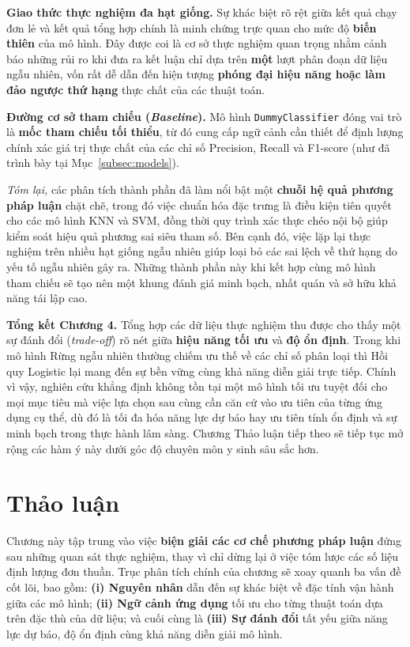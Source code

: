 \documentclass[14pt,a4paper]{extreport}
\begin{document}
\textbf{Giao thức thực nghiệm đa hạt giống.} Sự khác biệt rõ rệt giữa kết quả chạy đơn lẻ và kết quả tổng hợp chính là minh chứng trực quan cho mức độ \textbf{biến thiên} của mô hình. Đây được coi là cơ sở thực nghiệm quan trọng nhằm cảnh báo những rủi ro khi đưa ra kết luận chỉ dựa trên \textbf{một} lượt phân đoạn dữ liệu ngẫu nhiên, vốn rất dễ dẫn đến hiện tượng \textbf{phóng đại hiệu năng hoặc làm đảo ngược thứ hạng} thực chất của các thuật toán.

\textbf{Đường cơ sở tham chiếu (\textit{Baseline}).} Mô hình \texttt{DummyClassifier} đóng vai trò là \textbf{mốc tham chiếu tối thiểu}, từ đó cung cấp ngữ cảnh cần thiết để định lượng chính xác giá trị thực chất của các chỉ số Precision, Recall và F1-score (như đã trình bày tại Mục~\ref{subsec:models}).

\noindent\textit{Tóm lại,} các phân tích thành phần đã làm nổi bật một \textbf{chuỗi hệ quả phương pháp luận} chặt chẽ, trong đó việc chuẩn hóa đặc trưng là điều kiện tiên quyết cho các mô hình KNN và SVM, đồng thời quy trình xác thực chéo nội bộ giúp kiểm soát hiệu quả phương sai siêu tham số. Bên cạnh đó, việc lặp lại thực nghiệm trên nhiều hạt giống ngẫu nhiên giúp loại bỏ các sai lệch về thứ hạng do yếu tố ngẫu nhiên gây ra. Những thành phần này khi kết hợp cùng mô hình tham chiếu sẽ tạo nên một khung đánh giá minh bạch, nhất quán và sở hữu khả năng tái lập cao.

\textbf{Tổng kết Chương 4.} Tổng hợp các dữ liệu thực nghiệm thu được cho thấy một sự đánh đổi (\textit{trade-off}) rõ nét giữa \textbf{hiệu năng tối ưu} và \textbf{độ ổn định}. Trong khi mô hình Rừng ngẫu nhiên thường chiếm ưu thế về các chỉ số phân loại thì Hồi quy Logistic lại mang đến sự bền vững cùng khả năng diễn giải trực tiếp. Chính vì vậy, nghiên cứu khẳng định không tồn tại một mô hình tối ưu tuyệt đối cho mọi mục tiêu mà việc lựa chọn sau cùng cần căn cứ vào ưu tiên của từng ứng dụng cụ thể, dù đó là tối đa hóa năng lực dự báo hay ưu tiên tính ổn định và sự minh bạch trong thực hành lâm sàng. Chương Thảo luận tiếp theo sẽ tiếp tục mở rộng các hàm ý này dưới góc độ chuyên môn y sinh sâu sắc hơn.

\chapter{Thảo luận}
\label{sec:discussion}

\noindent Chương này tập trung vào việc \textbf{biện giải các cơ chế phương pháp luận} đứng sau những quan sát thực nghiệm, thay vì chỉ dừng lại ở việc tóm lược các số liệu định lượng đơn thuần. Trục phân tích chính của chương sẽ xoay quanh ba vấn đề cốt lõi, bao gồm: \textbf{(i) Nguyên nhân} dẫn đến sự khác biệt về đặc tính vận hành giữa các mô hình; \textbf{(ii) Ngữ cảnh ứng dụng} tối ưu cho từng thuật toán dựa trên đặc thù của dữ liệu; và cuối cùng là \textbf{(iii) Sự đánh đổi} tất yếu giữa năng lực dự báo, độ ổn định cùng khả năng diễn giải mô hình.
\end{document}

